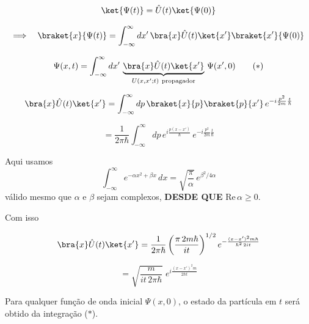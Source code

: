 \begin{equation}
    \ket{\Psi(t)} = \hat{U}(t)\ket{\Psi(0)}
\label{eq:aula14_evolucao_ket}
\end{equation}

\begin{equation}
    \Longrightarrow \quad \braket{x}{\Psi(t)} = \int_{-\infty}^{\infty} dx'\, \bra{x}\hat{U}(t)\ket{x'}\braket{x'}{\Psi(0)}
\label{eq:aula14_evolucao_proj_x}
\end{equation}

\begin{equation}
    \Psi(x,t) = \int_{-\infty}^{\infty} dx'\, \underbrace{\bra{x}\hat{U}(t)\ket{x'}}_{U(x,x';t)\ \text{propagador}}\, \Psi(x',0) \tag{$*$}
\label{eq:aula14_propagador_def}
\end{equation}

\begin{equation}
    \bra{x}\hat{U}(t)\ket{x'} = \int_{-\infty}^{\infty} dp\, \braket{x}{p}\braket{p}{x'}\, e^{-i\frac{p^2}{2m}\frac{t}{\hbar}}
\label{eq:aula14_U_xx_passo1}
\end{equation}

\begin{equation}
    = \frac{1}{2\pi\hbar}\int_{-\infty}^{\infty} dp\, e^{i\frac{p(x-x')}{\hbar}}\, e^{-i\frac{p^2}{2m}\frac{t}{\hbar}}
\label{eq:aula14_U_xx_passo2}
\end{equation}

Aqui usamos
\begin{equation}
    \int_{-\infty}^{\infty} e^{-\alpha x^2 + \beta x}\, dx = \sqrt{\frac{\pi}{\alpha}}\, e^{\beta^2/4\alpha}
\label{eq:aula14_integral_gaussiana}
\end{equation}
válido mesmo que $\alpha$ e $\beta$ sejam complexos, \textbf{DESDE QUE} $\text{Re}\,\alpha \geq 0$.

Com isso

\begin{equation}
    \bra{x}\hat{U}(t)\ket{x'} = \frac{1}{2\pi\hbar}\left(\frac{\pi\, 2m\hbar}{i t}\right)^{1/2} e^{-\frac{(x-x')^2 m\hbar}{\hbar^2\, 2it}}
\label{eq:aula14_U_xx_passo3}
\end{equation}

\begin{equation}
    = \sqrt{\frac{m}{it\, 2\pi\hbar}}\; e^{i\frac{(x-x')^2 m}{2\hbar t}}
\label{eq:aula14_propagador_final}
\end{equation}

Para qualquer função de onda inicial $\Psi(x,0)$, o estado da partícula em $t$ será obtido da integração ($*$).

